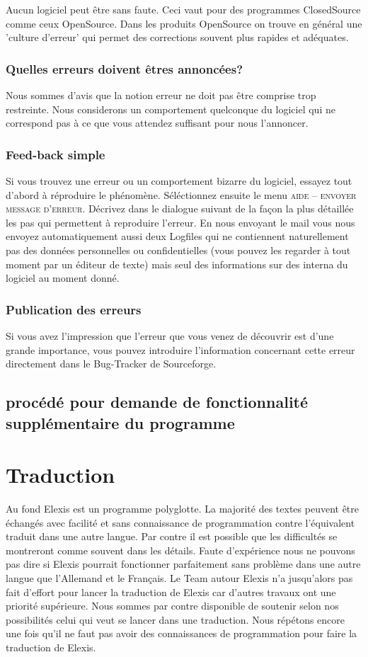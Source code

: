Aucun logiciel peut être sans faute. Ceci vaut pour des programmes ClosedSource comme ceux  OpenSource. Dans les produits OpenSource on trouve en général une 'culture d'erreur' qui permet des corrections souvent plus rapides et adéquates.
\subsection{Quelles erreurs doivent êtres annoncées?}
Nous sommes d'avis que la notion \glqq erreur\grqq{} ne doit pas être comprise trop restreinte. Nous considerons un comportement quelconque du logiciel qui ne correspond pas à ce que vous attendez suffisant pour nous l'annoncer.
\subsection{Feed-back simple}
Si vous trouvez une erreur ou un \glqq comportement bizarre\grqq{} du logiciel, essayez tout d'abord à réproduire le phénomène. Séléctionnez ensuite le menu \textsc{aide -- envoyer message d'erreur}. Décrivez dans le dialogue suivant de la façon la plus détaillée les pas qui permettent à reproduire l'erreur. En nous envoyant le mail vous nous envoyez automatiquement aussi deux Logfiles qui ne contiennent naturellement pas des données personnelles ou confidentielles (vous pouvez les regarder à tout moment par un éditeur de texte) mais seul des informations sur des interna du logiciel au moment donné. 
\subsection{Publication des erreurs}
Si vous avez l'impression que l'erreur que vous venez de découvrir est d'une grande importance, vous pouvez introduire l'information concernant cette erreur directement dans le Bug-Tracker de Sourceforge.

\section{procédé pour demande de fonctionnalité supplémentaire du programme}

\chapter{Traduction}
Au fond Elexis est un programme polyglotte. La majorité des textes peuvent être échangés avec facilité et sans connaissance de programmation contre l'équivalent traduit dans une autre langue. Par contre il est possible que les difficultés se montreront comme souvent dans les détails. Faute d'expérience nous ne pouvons pas dire si Elexis pourrait fonctionner parfaitement sans problème dans une autre langue que l'Allemand et le Français. 
Le Team autour Elexis n'a jusqu'alors pas fait d'effort pour lancer la traduction de Elexis car d'autres travaux ont une priorité supérieure. Nous sommes par contre disponible de soutenir selon nos possibilités celui qui veut se lancer dans une traduction. Nous répétons encore une fois qu'il ne faut pas avoir des connaissances de programmation pour faire la traduction de Elexis.

